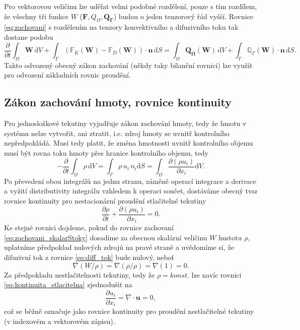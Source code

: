 Pro vektorovou veličinu lze udělat velmi podobné rozdělení, pouze s tím rozdílem, že všechny tři funkce $W$ ($\mathbf{F}, Q_{\Omega}, \mathbf{Q_\Gamma}$) budou o jeden tenzorový řád vyšší. Rovnice \ref{eq:zachovani} s rozdělením na tenzory konvektivního a difuzivního toku tak dostane podobu
\begin{equation}\label{eq:zachovani_vektor}
\dfrac{\partial}{\partial t} \int_{\Omega}\mathbf{W} \, \mathrm{d}V + \int_{\Gamma}\left(\mathbb{F}_K(\mathbf{W})-\mathbb{F}_D(\mathbf{W}) \right)\cdot \mathbf{n} \, \mathrm{d}S = \int_{\Omega} \mathbf{Q_\Omega}(\mathbf{W}) \, \mathrm{d}V + \int_{\Gamma} \mathbb{Q}_\Gamma(\mathbf{W}) \cdot \mathbf{n} \, \mathrm{d}S.
\end{equation}
Takto odvozený obecný zákon zachování (někdy taky bilanční rovnici) lze využít pro odvození základních rovnic proudění.



\subsection{Zákon zachování hmoty, rovnice kontinuity}
Pro jednosložkové tekutiny vyjadřuje zákon zachování hmoty, tedy že hmotu v systému nelze vytvořit, ani ztratit, i.e. zdroj hmoty se uvnitř kontrolního nepředpokládá. Musí tedy platit, že změna hmotnosti uvnitř kontrolního objemu musí být rovna toku hmoty přes hranice kontrolního objemu, tedy
\begin{equation}
-\dfrac{\partial}{\partial t}\int_\Omega \rho \,\mathrm{d}V = \int_\Gamma \rho \, u_i \, n_i \mathrm{d}S = \int_\Omega \dfrac{\partial\left(\rho u_i\right)}{\partial x_i}\mathrm{d}V.
\end{equation}
Po převedení obou integrálů na jednu stranu, záměně operací integrace a derivace a vyžití distributivity integrálu vzhledem k operaci součet, dostáváme obecný tvar rovnice kontinuity pro nestacionární proudění stlačitelné tekutiny
\begin{equation}\label{eq:kontinuita_stlacitelna}
\dfrac{\partial \rho}{\partial t} + \dfrac{\partial \left(\rho u_i\right)}{\partial x_i} = 0.
\end{equation}
Ke stejné rovnici dojdeme, pokud do rovnice zachovaní \ref{eq:zachovani_skalarStoky} dosadíme za obecnou skalární veličinu $W$ hustotu $\rho$, uplatníme předpoklad nulových zdrojů na pravé straně a uvědomíme si, že difuzivní tok z rovnice \ref{eq:diff_tok} bude nulový, neboť 
\begin{equation}
\nabla(W/\rho) = \nabla(\rho/\rho) = \nabla(1) = 0.
\end{equation} 
Za předpokladu nestlačitelnosti tekutiny, tedy že $\rho = konst.$ lze navíc rovnici \ref{eq:kontinuita_stlacitelna} zjednodušit na 
\begin{equation}\label{eq:kontinuita_nestlacitelna}
\dfrac{\partial u_i}{\partial x_i} = \nabla\cdot\mathbf{u} = 0,
\end{equation}
což se běžně označuje jako rovnice kontinuity pro proudění nestlačitelné tekutiny (v indexovém a vektorovém zápisu).

